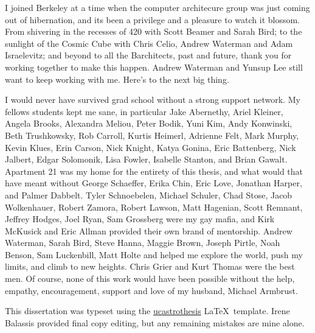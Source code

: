 \documentclass[12pt]{myucthesis}
\begin{document}
\begin{frontmatter}
\begin{acknowledgements}
I joined Berkeley at a time when the computer architecure group was just coming out of hibernation,
and its been a privilege and a pleasure to watch it blossom.
From shivering in the recesses of 420 with Scott Beamer and Sarah Bird;
to the sunlight of the Cosmic Cube with Chris Celio, Andrew Waterman and Adam Israelevitz;
and beyond to all the Barchitects, past and future, thank you for working together to make this happen.
Andrew Waterman and Yunsup Lee still want to keep working with me.
Here's to the next big thing.

I would never have survived grad school without a strong support network.
My fellows students kept me sane, in particular
Jake Abernethy, Ariel Kleiner, Angela Brooks, Alexandra Meliou, Peter Bodik, Yuni Kim,
Andy Konwinski, Beth Trushkowsky, Rob Carroll, Kurtis Heimerl, Adrienne Felt, Mark Murphy,
Kevin Klues, Erin Carson, Nick Knight, Katya Gonina, Eric Battenberg, Nick Jalbert, Edgar Solomonik,
Lisa Fowler, Isabelle Stanton, and Brian Gawalt.
Apartment 21 was my home for the entirety of this thesis, and what would that have meant without
George Schaeffer, Erika Chin, Eric Love, Jonathan Harper, and Palmer Dabbelt.
Tyler Schnoebelen, Michael Schuler, Chad Stose, Jacob Wolkenhauer, Robert Zamora, Robert Lawson, Matt Hagenian,
Scott Remnant, Jeffrey Hodges, Joel Ryan, Sam Grossberg were my gay mafia, and 
Kirk McKusick and Eric Allman provided their own brand of mentorship.
Andrew Waterman, Sarah Bird, Steve Hanna, Maggie Brown, Joseph Pirtle, Noah Benson, Sam Luckenbill, Matt Holte
and helped me explore the world, push my limits, and climb to new heights.
Chris Grier and Kurt Thomas were the best men.
Of course, none of this work would have been possible without the help, empathy, encouragement, support and love
 of my husband, Michael Armbrust.


This dissertation was typeset using the
\href{https://github.com/pkgw/ucastrothesis}{\textsf{ucastrothesis}}
\LaTeX\ template.
Irene Balassis provided final copy editing, but any remaining mistakes are mine alone.

\end{acknowledgements}
\end{frontmatter}







{}
\end{document}
